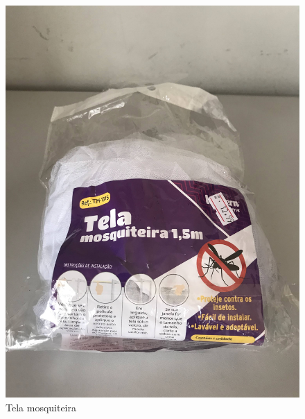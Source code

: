 \documentclass[
	12pt,				%
	openright,			%
	oneside,			%
	a4paper,			%
	chapter=TITLE,		%
	english,			%
	brazil				%
	]{abntex2}
\begin{document}
\begin{figure}[H]
    \centering
    \includegraphics[scale=0.04, angle=-90]{imagens/IMG_0602.jpg}
    \caption{Tela mosquiteira}
    \label{fig:mosquiteira}
\end{figure}   
\end{document}
